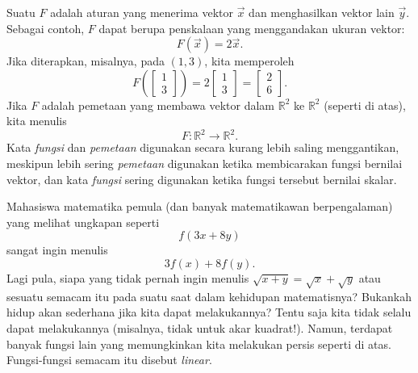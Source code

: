 Suatu \emph{}
$F$ adalah aturan yang menerima vektor $\vec{x}$ dan menghasilkan vektor lain
$\vec{y}$. Sebagai contoh, $F$ dapat berupa penskalaan yang menggandakan ukuran
vektor:
\begin{equation*}
F(\vec{x}) = 2 \vec{x} .
\end{equation*}
Jika diterapkan, misalnya, pada $(1,3)$, kita memperoleh
\begin{equation*}
F
\left( \begin{bmatrix} 1 \\ 3 \end{bmatrix} \right)
=
2
\begin{bmatrix} 1 \\ 3 \end{bmatrix}
=
\begin{bmatrix} 2 \\ 6 \end{bmatrix} .
\end{equation*}
Jika $F$ adalah pemetaan yang membawa vektor dalam
${\mathbb R}^2$ ke
${\mathbb R}^2$ (seperti di atas), kita menulis
\begin{equation*}
F \colon {\mathbb R}^2 \to {\mathbb R}^2 .
\end{equation*}
Kata \emph{fungsi} dan \emph{pemetaan} digunakan secara kurang lebih saling menggantikan,
meskipun lebih sering \emph{pemetaan} digunakan ketika membicarakan
fungsi bernilai vektor, dan kata \emph{fungsi} sering digunakan ketika
fungsi tersebut bernilai skalar.

Mahasiswa matematika pemula (dan banyak matematikawan berpengalaman)
yang melihat ungkapan seperti
\begin{equation*}
f(3x+8y)
\end{equation*}
sangat ingin menulis
\begin{equation*}
3f(x)+8f(y) .
\end{equation*}
Lagi pula, siapa yang tidak pernah ingin menulis $\sqrt{x+y} = \sqrt{x} + \sqrt{y}$ atau
sesuatu semacam itu pada suatu saat dalam kehidupan matematisnya?
Bukankah hidup akan sederhana jika kita dapat melakukannya?
Tentu saja kita tidak selalu dapat melakukannya (misalnya, tidak untuk akar
kuadrat!).
Namun, terdapat banyak fungsi lain yang memungkinkan kita melakukan persis seperti di atas.
Fungsi-fungsi semacam itu disebut \emph{linear}.

